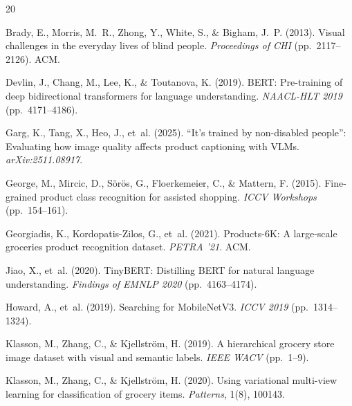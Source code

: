 \documentclass[10pt,twocolumn]{article}
\begin{document}
\begin{thebibliography}{20}
\providecommand{\natexlab}[1]{#1}

Brady, E., Morris, M.~R., Zhong, Y., White, S., \& Bigham, J.~P. (2013).
\newblock Visual challenges in the everyday lives of blind people.
\newblock \emph{Proceedings of CHI} (pp.\ 2117--2126). ACM.

Devlin, J., Chang, M., Lee, K., \& Toutanova, K. (2019).
\newblock BERT: Pre-training of deep bidirectional transformers for language understanding.
\newblock \emph{NAACL-HLT 2019} (pp.\ 4171--4186).

Garg, K., Tang, X., Heo, J., et~al. (2025).
\newblock ``It's trained by non-disabled people'': Evaluating how image quality affects product captioning with VLMs.
\newblock \emph{arXiv:2511.08917}.

George, M., Mircic, D., S\"{o}r\"{o}s, G., Floerkemeier, C., \& Mattern, F. (2015).
\newblock Fine-grained product class recognition for assisted shopping.
\newblock \emph{ICCV Workshops} (pp.\ 154--161).

Georgiadis, K., Kordopatis-Zilos, G., et~al. (2021).
\newblock Products-6K: A large-scale groceries product recognition dataset.
\newblock \emph{PETRA '21}. ACM.

Jiao, X., et~al. (2020).
\newblock TinyBERT: Distilling BERT for natural language understanding.
\newblock \emph{Findings of EMNLP 2020} (pp.\ 4163--4174).

Howard, A., et~al. (2019).
\newblock Searching for MobileNetV3.
\newblock \emph{ICCV 2019} (pp.\ 1314--1324).

Klasson, M., Zhang, C., \& Kjellstr\"{o}m, H. (2019).
\newblock A hierarchical grocery store image dataset with visual and semantic labels.
\newblock \emph{IEEE WACV} (pp.\ 1--9).

Klasson, M., Zhang, C., \& Kjellstr\"{o}m, H. (2020).
\newblock Using variational multi-view learning for classification of grocery items.
\newblock \emph{Patterns}, 1(8), 100143.


\end{thebibliography}
\end{document}
